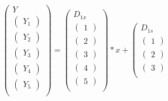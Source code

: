 \documentclass[10pt]{article}
\begin{document}
\[\left(\begin{array}{c}
  Y\\
  \hline
  \left(\begin{array}{c} Y_{1} \end{array}\right)\\
  \left(\begin{array}{c} Y_{2} \end{array}\right)\\
  \left(\begin{array}{c} Y_{3} \end{array}\right)\\
  \left(\begin{array}{c} Y_{4} \end{array}\right)\\
  \left(\begin{array}{c} Y_{5} \end{array}\right)\\
\end{array}\right) =
\left(\begin{array}{c}
  D_{1x}\\
  \hline
  \left(\begin{array}{c}1\end{array}\right)\\
  \left(\begin{array}{c}2\end{array}\right)\\
  \left(\begin{array}{c}3\end{array}\right)\\
  \left(\begin{array}{c}4\end{array}\right)\\
  \left(\begin{array}{c}5\end{array}\right)\\
\end{array}\right)*x +
\left(\begin{array}{c}
  D_{1s}\\
  \hline
  \left(\begin{array}{c}1\end{array}\right)\\
  \left(\begin{array}{c}2\end{array}\right)\\
  \left(\begin{array}{c}3\end{array}\right)\\

\end{array}\]
\end{document}
